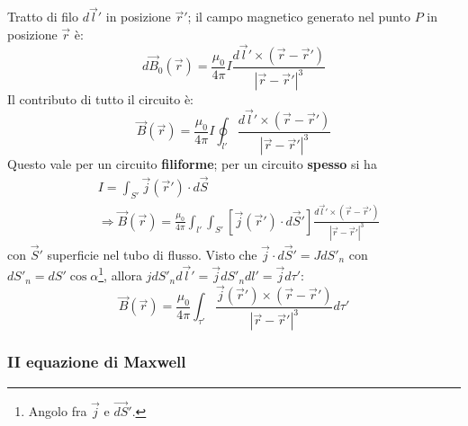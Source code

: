 \documentclass[a4paper]{scrartcl}
\numberwithin{equation}{subsection}
\theoremstyle{style1}
\begin{document}
Tratto di filo $d\vec{l}'$ in posizione $\vec{r}'$; il campo magnetico generato nel punto $P$ in posizione $\vec{r}$ \`e:
\begin{equation}
	d\vec{B}_0 (\vec{r})= \frac{\mu_0}{4 \pi} I \frac{d\vec{l}' \times (\vec{r}-\vec{r}')}{\left\lvert \vec{r}-\vec{r}' \right\rvert ^3}
\end{equation}
Il contributo di tutto il circuito \`e:
\begin{equation}
	\vec{B} (\vec{r}) = \frac{\mu_0}{4\pi}I \oint_{l'} \frac{d\vec{l}' \times (\vec{r}-\vec{r}')}{\left\lvert \vec{r}-\vec{r}' \right\rvert^3 }
\end{equation}
Questo vale per un circuito \textbf{filiforme}; per un circuito \textbf{spesso} si ha
\begin{equation}
	\begin{split}
		&I = \int_{S'}\vec{j}(\vec{r}') \cdot d\vec{S}\\
		&\Rightarrow\vec{B}(\vec{r}) = \frac{\mu _0}{4 \pi }\int_{l'} \int_{S'} \left[ \vec{j}(\vec{r}')\cdot d\vec{S}' \right] \frac{d\vec{l}'\times (\vec{r}-\vec{r}')}{\left\lvert \vec{r}-\vec{r}' \right\rvert ^3}
	\end{split}
\end{equation}
con $\vec{S}'$ superficie nel tubo di flusso. Visto che $\vec{j}\cdot d\vec{S}' = JdS'_n$ con $dS'_n = dS' \cos \alpha $\footnote{Angolo fra $\vec{j}$ e $\vec{dS}'$.}, allora $jdS'_n d\vec{l}' = \vec{j}dS'_n dl' = \vec{j}d\tau '$:
\begin{equation}
	\vec{B}(\vec{r}) = \frac{\mu _0}{4\pi} \int_{\tau '} \frac{\vec{j}(\vec{r}') \times (\vec{r}-\vec{r}')}{\left\lvert \vec{r}-\vec{r}' \right\rvert^3 }d\tau '
\end{equation}
\subsubsection{II equazione di Maxwell}
\end{document}
